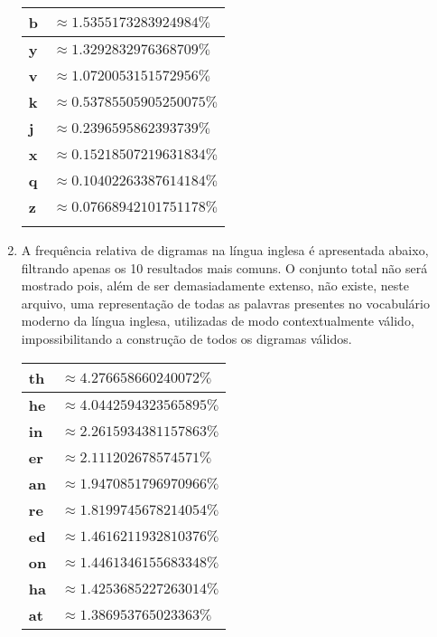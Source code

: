 \documentclass{article}
\begin{document}
\begin{enumerate}
\begin{center}
\begin{minipage}{.33\linewidth}
\begin{tabular}{ll}
            \end{tabular}
        \end{minipage}
        \begin{minipage}{.33\linewidth}
            \begin{tabular}{ll}
                \hline
                \textbf{b} & $\approx 1.5355173283924984\%$ \\ \hline
                \textbf{y} & $\approx 1.3292832976368709\%$ \\ \hline
                \textbf{v} & $\approx 1.0720053151572956\%$ \\ \hline
                \textbf{k} & $\approx 0.53785505905250075\%$ \\ \hline
                \textbf{j} & $\approx 0.2396595862393739\%$ \\ \hline
                \textbf{x} & $\approx 0.15218507219631834\%$ \\ \hline
                \textbf{q} & $\approx 0.10402263387614184\%$ \\ \hline
                \textbf{z} & $\approx 0.07668942101751178\%$ \\ \hline
                & \\ \hline
            \end{tabular}
        \end{minipage}
    \end{center}
    \item A frequência relativa de digramas na língua inglesa é apresentada abaixo, filtrando apenas os 10 resultados mais comuns. O conjunto total não será mostrado pois, além de ser demasiadamente extenso, não existe, neste arquivo, uma representação de todas as palavras presentes no vocabulário moderno da língua inglesa, utilizadas de modo contextualmente válido, impossibilitando a construção de todos os digramas válidos.
    \begin{center}
    \begin{tabular}{ll}
        \hline
        \textbf{th} & $\approx 4.276658660240072\%$ \\ \hline
        \textbf{he} & $\approx 4.0442594323565895\%$ \\ \hline
        \textbf{in} & $\approx 2.2615934381157863\%$ \\ \hline
        \textbf{er} & $\approx 2.111202678574571\%$ \\ \hline
        \textbf{an} & $\approx 1.9470851796970966\%$ \\ \hline
        \textbf{re} & $\approx 1.8199745678214054\%$ \\ \hline
        \textbf{ed} & $\approx 1.4616211932810376\%$ \\ \hline
        \textbf{on} & $\approx 1.4461346155683348\%$ \\ \hline
        \textbf{ha} & $\approx 1.4253685227263014\%$ \\ \hline
        \textbf{at} & $\approx 1.386953765023363\%$ \\ \hline
    \end{tabular}
    \end{center}
\end{enumerate}
\end{document}
